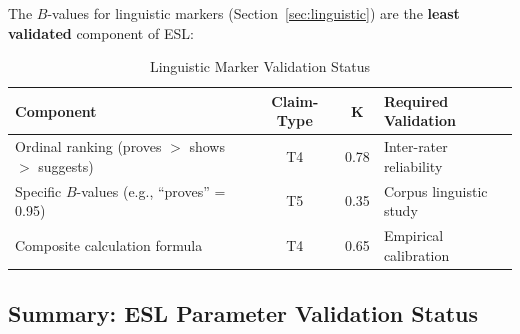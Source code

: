 \documentclass[11pt,a4paper]{article}
\begin{document}
The $B$-values for linguistic markers (Section~\ref{sec:linguistic}) are the \textbf{least validated} component of ESL:

\begin{table}[h]
\centering
\caption{Linguistic Marker Validation Status}
\label{tab:ling-validation}
\begin{tabular}{lccl}
\toprule
\textbf{Component} & \textbf{Claim-Type} & \textbf{K} & \textbf{Required Validation} \\
\midrule
Ordinal ranking (proves $>$ shows $>$ suggests) & T4 & 0.78 & Inter-rater reliability \\
Specific $B$-values (e.g., ``proves'' = 0.95) & T5 & 0.35 & Corpus linguistic study \\
Composite calculation formula & T4 & 0.65 & Empirical calibration \\
\bottomrule
\end{tabular}
\end{table}

\subsection{Summary: ESL Parameter Validation Status}
\end{document}
